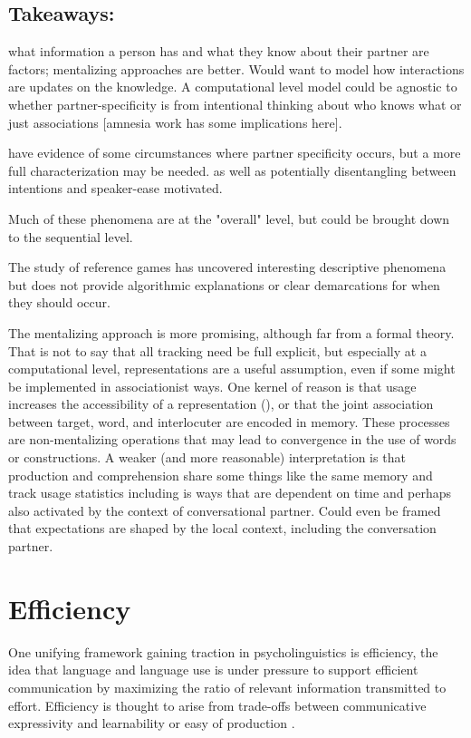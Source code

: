 \documentclass[]{article}
\begin{document}
\subsection{Takeaways:} what information a person has and what they know about their partner are factors; mentalizing approaches are better. Would want to model how interactions are updates on the knowledge. A computational level model could be agnostic to whether partner-specificity is from intentional thinking about who knows what or just associations [amnesia work has some implications here].  

have evidence of some circumstances where partner specificity occurs, but a more full characterization may be needed. as well as potentially disentangling between intentions and speaker-ease motivated. 

Much of these phenomena are at the "overall" level, but could be brought down to the sequential level. 

The study of reference games has uncovered interesting descriptive phenomena but does not provide algorithmic explanations or clear demarcations for when they should occur. 


The mentalizing approach is more promising, although far from a formal theory. That is not to say that all tracking need be full explicit, but especially at a computational level, representations are a useful assumption, even if some might be implemented in associationist ways.  One kernel of reason is that usage increases the accessibility of a representation (\cite{macdonald1994}), or that the joint association between target, word, and interlocuter are encoded in memory. These processes are non-mentalizing operations that may lead to convergence in the use of words or constructions. A weaker (and more reasonable) interpretation is that production and comprehension share some things like the same memory and track usage statistics including is ways that are dependent on time and perhaps also activated by the context of conversational partner.  Could even be framed that expectations are shaped by the local context, including the conversation partner. 

\section{Efficiency}
One unifying framework gaining traction in psycholinguistics is efficiency, the idea that language and language use is under pressure to support efficient communication by maximizing the ratio of relevant information transmitted to effort. Efficiency is thought to arise from trade-offs between communicative expressivity and learnability or easy of production \cite{piantadosi2012, kirby2015}. 
\end{document}
